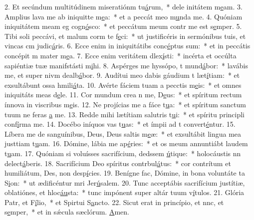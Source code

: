 2. Et secúndum multitúdinem miseratiónm tu\uline{á}rum,~* dele initátem m\uline{e}am.
3. Amplius lava me ab iniquitte m\uline{e}a:~* et a peccát meo m\uline{u}nda me.
4. Quóniam iniquitátem meam eg cogn\uline{ó}sco:~* et peccátum meum contr me est s\uline{e}mper.
5. Tibi soli peccávi, et malum corm te f\uline{e}ci:~* ut justificéris in sermónibus tuis, et vincas cm judic\uline{á}ris.
6. Ecce enim in iniquitátibs conc\uline{é}ptus sum:~* et in peccátis concépit m mater m\uline{e}a.
7. Ecce enim veritátem dlex\uline{í}sti:~* incérta et occúlta sapiéntiæ tuæ manifstásti m\uline{i}hi.
8. Aspérges me hyssópo, t mund\uline{á}bor:~* lavábis me, et super nivm dealb\uline{á}bor.
9. Audítui meo dabis gáudium t læt\uline{í}tiam:~* et exsultábunt ossa hmili\uline{á}ta.
10. Avérte fáciem tuam a pecctis m\uline{e}is:~* et omnes iniquitáts meas d\uline{e}le.
11. Cor mundum crea n me, D\uline{e}us:~* et spíritum rectum ínnova in viscribus m\uline{e}is.
12. Ne projícias me a fáce t\uline{u}a:~* et spíritum sanctum tuum ne feras \uline{a} me.
13. Redde mihi lætítiam salutris t\uline{u}i:~* et spíritu principli conf\uline{í}rma me.
14. Docébo iníquos vas t\uline{u}as:~* et ímpii ad t convert\uline{é}ntur.
15. Líbera me de sanguínibus, Deus, Deus saltis m\uline{e}æ:~* et exsultábit lingua mea justtiam t\uline{u}am.
16. Dómine, lábia me ap\uline{é}ries:~* et os meum annuntiábt laudem t\uline{u}am.
17. Quóniam si voluísses sacrifícium, dedssem \uline{ú}tique:~* holocáustis nn delect\uline{á}beris.
18. Sacrifícium Deo spíritus contrbul\uline{á}tus:~* cor contrítum et humiliátum, Des, non desp\uline{í}cies.
19. Benígne fac, Dómine, in bona voluntáte ta S\uline{i}on:~* ut ædificéntur mri Jer\uline{ú}salem.
20. Tunc acceptábis sacrifícium justítiæ, oblatiónes, et hloc\uline{áu}sta:~* tunc impónent super altár tuum v\uline{í}tulos.
21. Glória Patr, et F\uline{í}lio,~* et Spirtui S\uline{a}ncto.
22. Sicut erat in princípio, et nnc, et s\uline{e}mper,~* et in sǽcula sæclórum. \uline{A}men.
